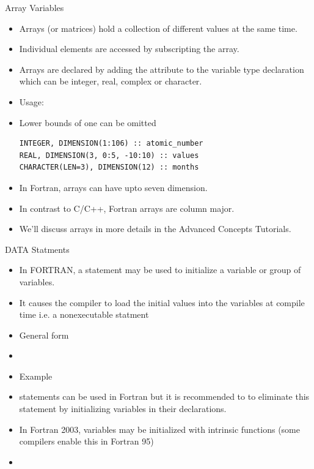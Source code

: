\documentclass[10pt,t]{beamer}
\begin{document}
\begin{frame}[fragile]{Array Variables}
  \begin{itemize}
    \item Arrays (or matrices) hold a collection of different values at the same time.
    \item Individual elements are accessed by subscripting the array.
    \item Arrays are declared by adding the  attribute to the variable type declaration which can be integer, real, complex or character.
    \item Usage: 
    \item[] Lower bounds of one can be omitted
      \begin{lstlisting}[language={[90]Fortran}]
INTEGER, DIMENSION(1:106) :: atomic_number
REAL, DIMENSION(3, 0:5, -10:10) :: values
CHARACTER(LEN=3), DIMENSION(12) :: months
      \end{lstlisting}
    \item In Fortran, arrays can have upto seven dimension.
    \item In contrast to C/C++, Fortran arrays are column major.
    \item We'll discuss arrays in more details in the Advanced Concepts Tutorials.
  \end{itemize}
\end{frame}

\begin{frame}{DATA Statments}
  \begin{itemize}
    \item In FORTRAN, a  statement may be used to initialize a variable or group of variables.
    \item It causes the compiler to load the initial values into the variables at compile time i.e. a nonexecutable statment
    \item General form
    \item[] 
    \item[] Example 
    \item {} statements can be used in Fortran but it is recommended to to eliminate this statement by initializing variables in their declarations.
    \item In Fortran 2003, variables may be initialized with intrinsic functions (some compilers enable this in Fortran 95)
    \item[] 
  \end{itemize}
\end{frame}
\end{document}
